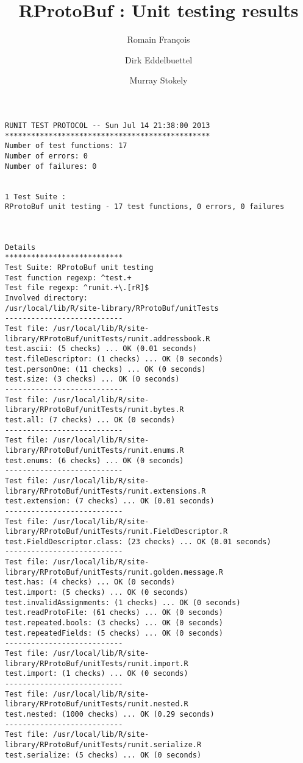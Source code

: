 \documentclass[10pt]{article}
\author{Romain Fran\c{c}ois \and Dirk Eddelbuettel \and Murray Stokely}
\title{RProtoBuf : Unit testing results}
\begin{document}
\maketitle

\begin{verbatim}
RUNIT TEST PROTOCOL -- Sun Jul 14 21:38:00 2013 
*********************************************** 
Number of test functions: 17 
Number of errors: 0 
Number of failures: 0 

 
1 Test Suite : 
RProtoBuf unit testing - 17 test functions, 0 errors, 0 failures



Details 
*************************** 
Test Suite: RProtoBuf unit testing 
Test function regexp: ^test.+ 
Test file regexp: ^runit.+\.[rR]$ 
Involved directory: 
/usr/local/lib/R/site-library/RProtoBuf/unitTests 
--------------------------- 
Test file: /usr/local/lib/R/site-library/RProtoBuf/unitTests/runit.addressbook.R 
test.ascii: (5 checks) ... OK (0.01 seconds)
test.fileDescriptor: (1 checks) ... OK (0 seconds)
test.personOne: (11 checks) ... OK (0 seconds)
test.size: (3 checks) ... OK (0 seconds)
--------------------------- 
Test file: /usr/local/lib/R/site-library/RProtoBuf/unitTests/runit.bytes.R 
test.all: (7 checks) ... OK (0 seconds)
--------------------------- 
Test file: /usr/local/lib/R/site-library/RProtoBuf/unitTests/runit.enums.R 
test.enums: (6 checks) ... OK (0 seconds)
--------------------------- 
Test file: /usr/local/lib/R/site-library/RProtoBuf/unitTests/runit.extensions.R 
test.extension: (7 checks) ... OK (0.01 seconds)
--------------------------- 
Test file: /usr/local/lib/R/site-library/RProtoBuf/unitTests/runit.FieldDescriptor.R 
test.FieldDescriptor.class: (23 checks) ... OK (0.01 seconds)
--------------------------- 
Test file: /usr/local/lib/R/site-library/RProtoBuf/unitTests/runit.golden.message.R 
test.has: (4 checks) ... OK (0 seconds)
test.import: (5 checks) ... OK (0 seconds)
test.invalidAssignments: (1 checks) ... OK (0 seconds)
test.readProtoFile: (61 checks) ... OK (0 seconds)
test.repeated.bools: (3 checks) ... OK (0 seconds)
test.repeatedFields: (5 checks) ... OK (0 seconds)
--------------------------- 
Test file: /usr/local/lib/R/site-library/RProtoBuf/unitTests/runit.import.R 
test.import: (1 checks) ... OK (0 seconds)
--------------------------- 
Test file: /usr/local/lib/R/site-library/RProtoBuf/unitTests/runit.nested.R 
test.nested: (1000 checks) ... OK (0.29 seconds)
--------------------------- 
Test file: /usr/local/lib/R/site-library/RProtoBuf/unitTests/runit.serialize.R 
test.serialize: (5 checks) ... OK (0 seconds)\end{verbatim}
\end{document}
